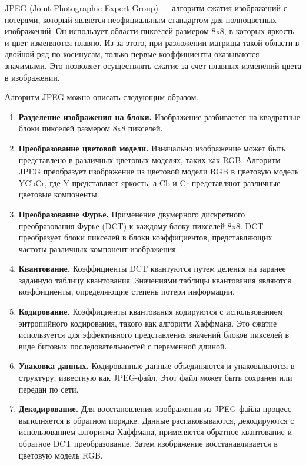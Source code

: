 JPEG (Joint Photographic Expert Group) --- алгоритм сжатия изображений с потерями, который является неофициальным стандартом для полноцветных изображений. Он использует области пикселей размером 8x8, в которых яркость и цвет изменяются плавно. Из-за этого, при разложении матрицы такой области в двойной ряд по косинусам, только первые коэффициенты оказываются значимыми. Это позволяет осуществлять сжатие за счет плавных изменений цвета в изображении.

Алгоритм JPEG можно описать следующим образом.
\begin{enumerate}
    \item \textbf{Разделение изображения на блоки.} Изображение разбивается на квадратные блоки пикселей размером 8x8 пикселей.
    \item \textbf{Преобразование цветовой модели.} Изначально изображение может быть представлено в различных цветовых моделях, таких как RGB. Алгоритм JPEG преобразует изображение из цветовой модели RGB в цветовую модель YCbCr, где Y представляет яркость, а Cb и Cr представляют различные цветовые компоненты.
    \item \textbf{Преобразование Фурье.} Применение двумерного дискретного преобразования Фурье (DCT) к каждому блоку пикселей 8x8. DCT преобразует блоки пикселей в блоки коэффициентов, представляющих частоты различных компонент изображения.
    \item \textbf{Квантование.} Коэффициенты DCT квантуются путем деления на заранее заданную таблицу квантования. Значениями таблицы квантования являются коэффициенты, определяющие степень потери информации.
    \item \textbf{Кодирование.} Коэффициенты квантования кодируются с использованием энтропийного кодирования, такого как алгоритм Хаффмана. Это сжатие используется для эффективного представления значений блоков пикселей в виде битовых последовательностей с переменной длиной.
    \item \textbf{Упаковка данных.} Кодированные данные объединяются и упаковываются в структуру, известную как JPEG-файл. Этот файл может быть сохранен или передан по сети.
    \item \textbf{Декодирование.} Для восстановления изображения из JPEG-файла процесс выполняется в обратном порядке. Данные распаковываются, декодируются с использованием алгоритма Хаффмана, применяется обратное квантование и обратное DCT преобразование. Затем изображение восстанавливается в цветовую модель RGB.
\end{enumerate}

